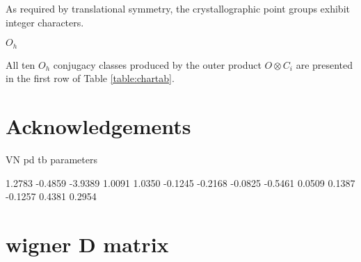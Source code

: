 \documentclass[twocolumn,showpacs,preprintnumbers,superscriptaddress,prb,floatfix,aps,10pt]{revtex4-1}
\begin{document}
As required by translational symmetry, the crystallographic point groups exhibit integer characters.







$O_h$



All ten $O_h$ conjugacy classes produced by the outer product $O \otimes C_i$ are presented in the first row of Table \ref{table:chartab}.







\section{Acknowledgements}



\clearpage

VN pd tb parameters

    1.2783
   -0.4859
   -3.9389
    1.0091
    1.0350
   -0.1245
   -0.2168
   -0.0825
   -0.5461
    0.0509
    0.1387
   -0.1257
    0.4381
    0.2954




\appendix

%
%
\section{wigner D matrix} 
\label{appendix:wigner}
\end{document}
